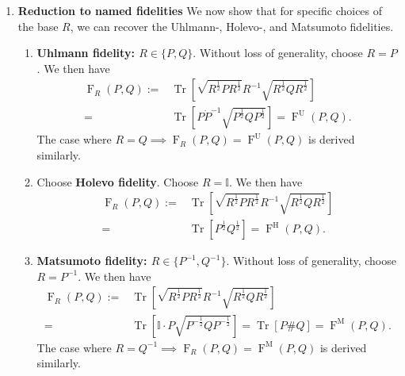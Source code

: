 \documentclass[12pt]{article}
\theoremstyle{definition}
\begin{document}
\begin{enumerate}[noitemsep, left=0pt]
    \item \textbf{Reduction to named fidelities} We now show that for specific choices of the base $R$, we can recover the Uhlmann-, Holevo-, and Matsumoto fidelities. 
    \begin{enumerate}
        \item \textbf{Uhlmann fidelity: $R \in \{P,Q\}$}. Without loss of generality, choose $R = P$. We then have
            \begin{equation}
            \begin{aligned}
                \operatorname{F}_R(P,Q) := &\operatorname{Tr}\left[\sqrt{ R^{\frac12} P R^{\frac12}} R^{-1}\sqrt{ R^{\frac12} Q R^{\frac12}}  \right] \\ = &\operatorname{Tr}\left[P \dot P ^{-1} \sqrt{P^{\frac12}  Q P^{\frac12}  }\right] = \operatorname{F}^\mathrm U(P,Q).
            \end{aligned}
            \end{equation}
            The case where $R = Q \implies \operatorname{F}_R(P,Q) = \operatorname{F}^\mathrm U(P,Q) $ is derived similarly. 

        \item Choose \textbf{Holevo fidelity}. Choose $R = \mathbb I$. We then have
            \begin{equation}
            \begin{aligned}
                \operatorname{F}_R(P,Q) := &\operatorname{Tr}\left[\sqrt{ R^{\frac12} P R^{\frac12}} R^{-1}\sqrt{ R^{\frac12} Q R^{\frac12}}  \right] \\ = &\operatorname{Tr}\left[ P^{\frac12}   Q^{\frac12} \right] = \operatorname{F}^\mathrm H(P,Q).
            \end{aligned}
            \end{equation}

        \item \textbf{Matsumoto fidelity: $R \in \{P ^{-1} ,Q ^{-1} \}$}. Without loss of generality, choose $R = P^{-1} $. We then have
            \begin{equation}
            \begin{aligned}
                \operatorname{F}_R(P,Q) := &\operatorname{Tr}\left[\sqrt{ R^{\frac12} P R^{\frac12}} R^{-1}\sqrt{ R^{\frac12} Q R^{\frac12}}  \right] \\ = &\operatorname{Tr} \left[\mathbb I \cdot P \sqrt{P ^{-\frac12} Q P ^{-\frac12} } \right] = \operatorname{Tr}[P\#Q] = \operatorname{F}^\mathrm M(P,Q).
            \end{aligned}
            \end{equation}
            The case where $R = Q^{-1}  \implies \operatorname{F}_R(P,Q) = \operatorname{F}^\mathrm M(P,Q) $ is derived similarly. 
    \end{enumerate}

    
    
\end{enumerate}
\end{document}
